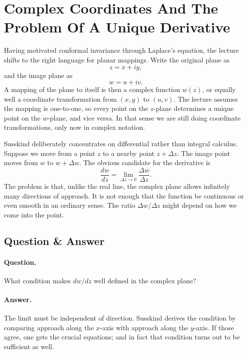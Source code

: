 \section{Complex Coordinates And The Problem Of A Unique Derivative}

Having motivated conformal invariance through Laplace's equation, the lecture shifts to the right language for planar mappings. Write the original plane as
\begin{equation}
z=x+iy,
\end{equation}
and the image plane as
\begin{equation}
w=u+iv.
\end{equation}
A mapping of the plane to itself is then a complex function \(w(z)\), or equally well a coordinate transformation from \((x,y)\) to \((u,v)\). The lecture assumes the mapping is one-to-one, so every point on the \(z\)-plane determines a unique point on the \(w\)-plane, and vice versa. In that sense we are still doing coordinate transformations, only now in complex notation.

Susskind deliberately concentrates on differential rather than integral calculus. Suppose we move from a point \(z\) to a nearby point \(z+\Delta z\). The image point moves from \(w\) to \(w+\Delta w\). The obvious candidate for the derivative is
\begin{equation}
\frac{dw}{dz}
=
\lim_{\Delta z\to 0}\frac{\Delta w}{\Delta z}.
\end{equation}
The problem is that, unlike the real line, the complex plane allows infinitely many directions of approach. It is not enough that the function be continuous or even smooth in an ordinary sense. The ratio \(\Delta w/\Delta z\) might depend on how we come into the point.

\subsection{Question \& Answer}

\paragraph{Question.} What condition makes \(dw/dz\) well defined in the complex plane?

\paragraph{Answer.} The limit must be independent of direction. Susskind derives the condition by comparing approach along the \(x\)-axis with approach along the \(y\)-axis. If those agree, one gets the crucial equations; and in fact that condition turns out to be sufficient as well.

